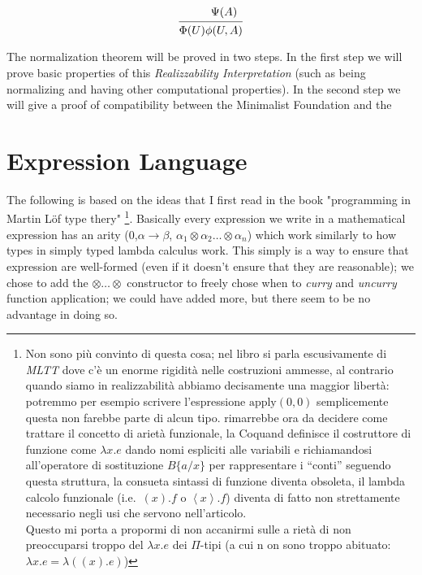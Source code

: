 \documentclass[12pt,draft,oneside]{amsbook}
\begin{document}
\begin{dede}
	\begin{gather}
	\begin{prooftree}
	\Hypo{\phantom{\Psi(A)}}
	\Infer1{\Phi(U)}
	\end{prooftree}
	\begin{prooftree}
	\Hypo{\Psi(A)}
	\Infer1{\phi(U,A)}
	\end{prooftree}	
	\end{gather}	
	
	\end{dede}
	
	The normalization theorem will be proved in two steps. In the first step we will prove basic properties of this \emph{Realizzability Interpretation} (such as being normalizing and having other computational properties). In the second step we will give a proof of compatibility between the Minimalist Foundation and the 
	
 	
\chapter{Expression Language}
	The following is based on the ideas that I first read in the book "programming in Martin Löf type thery" 
	\footnote{\label{qwe13}Non sono più convinto di questa cosa; nel libro si parla escusivamente di \emph{MLTT} dove c'è un enorme rigidità nelle costruzioni ammesse, al contrario quando siamo in realizzabilità abbiamo decisamente una maggior libertà: potremmo per esempio scrivere l'espressione $\text{apply}(0,0)$ semplicemente questa non farebbe parte di alcun tipo.
	rimarrebbe ora da decidere come trattare il concetto di arietà funzionale, la Coquand definisce il costruttore di funzione come $\lambda x . e$ dando nomi espliciti alle variabili e richiamandosi all'operatore di sostituzione $B\{a/x\}$ per rappresentare i ``conti'' seguendo questa struttura, la consueta sintassi di funzione diventa obsoleta, il lambda calcolo funzionale (i.e.\ $(x).f$ o $\left\langle x\right\rangle.f$) diventa di fatto non strettamente necessario negli usi che servono nell'articolo. \\
	Questo mi porta a propormi di non accanirmi sulle a
	rietà di non preoccuparsi troppo del $\lambda x.e$ dei $\Pi$-tipi (a cui n
	on sono troppo abituato: $\lambda x.e 
	= \lambda ((x).e)$) 
	}. 
	Basically every expression we write in a mathematical expression has an arity (0,$\alpha\rightarrow\beta$, $\alpha_1\otimes\alpha_2\ldots\otimes\alpha_n$) which work similarly to how types in simply typed lambda calculus work. 
	This simply is a way to ensure that expression are well-formed (even if it doesn't ensure that they are reasonable); we chose to add the $\otimes\ldots\otimes$ constructor to freely chose when to \emph{curry} and \emph{uncurry} function application; we could have added more, but there seem to be no advantage in doing so.
	
\end{document}
